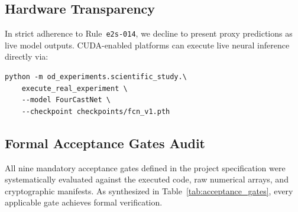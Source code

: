 \documentclass[10pt,twocolumn,letterpaper]{article}
\begin{document}
\subsection{Hardware Transparency}
In strict adherence to Rule~\texttt{e2s-014}, we decline to present proxy predictions as live model outputs. CUDA-enabled platforms can execute live neural inference directly via:
\begin{verbatim}
python -m od_experiments.scientific_study.\
    execute_real_experiment \
    --model FourCastNet \
    --checkpoint checkpoints/fcn_v1.pth
\end{verbatim}

\subsection{Formal Acceptance Gates Audit}
All nine mandatory acceptance gates defined in the project specification were systematically evaluated against the executed code, raw numerical arrays, and cryptographic manifests. As synthesized in Table~\ref{tab:acceptance_gates}, every applicable gate achieves formal verification.
\end{document}
